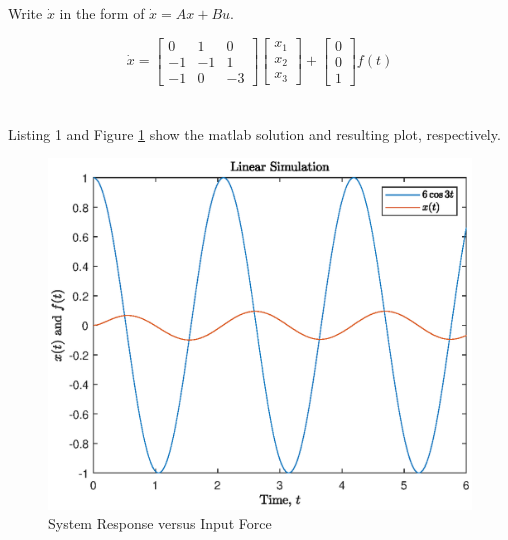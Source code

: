 \documentclass[12pt]{article}
\numberwithin{equation}{section}
\begin{document}
  Write $ \dot x $ in the form of $ \dot x = Ax + Bu. $

  \begin{equation}
    \dot x =
    \begin{bmatrix}
      0 & 1 & 0 \\
      -1 & -1 & 1 \\
      -1 & 0 & -3
    \end{bmatrix}
    \begin{bmatrix}
      x_1 \\ x_2 \\ x_3
    \end{bmatrix} +
    \begin{bmatrix}
      0 \\ 0 \\ 1
    \end{bmatrix} f(t)
  \end{equation}

  \newpage


  \section{}

  Listing 1 and Figure \ref{fig:problem5} show the matlab solution and resulting plot, respectively.

  

  \begin{figure}[ht!]
    \centering
    \includegraphics[width=\textwidth]{figures/problem5.eps}
    \caption{System Response versus Input Force}
    \label{fig:problem5}
  \end{figure}
\end{document}
